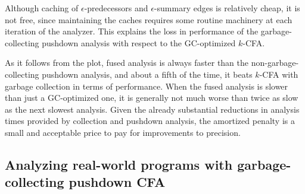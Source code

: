 Although caching of $\epsilon$-predecessors and $\epsilon$-summary
edges is relatively cheap, it is not free, since maintaining the
caches requires some routine machinery at each iteration of the
analyzer. This explains the loss in performance of the
garbage-collecting pushdown analysis with respect to the GC-optimized
$k$-CFA.

As it follows from the plot, fused analysis is always faster than
the non-garbage-collecting pushdown analysis, and about a fifth of the time, it beats
$k$-CFA with garbage collection in terms of performance.
When the fused analysis is slower than just a GC-optimized one, it is
generally not much worse than twice as slow as the next slowest
analysis.
Given the already substantial reductions in analysis times provided by
collection and pushdown analysis, the amortized penalty is a small and
acceptable price to pay for improvements to precision.


\subsection{Analyzing real-world programs with garbage-collecting pushdown CFA}
\label{sec:analysing-real-life}

